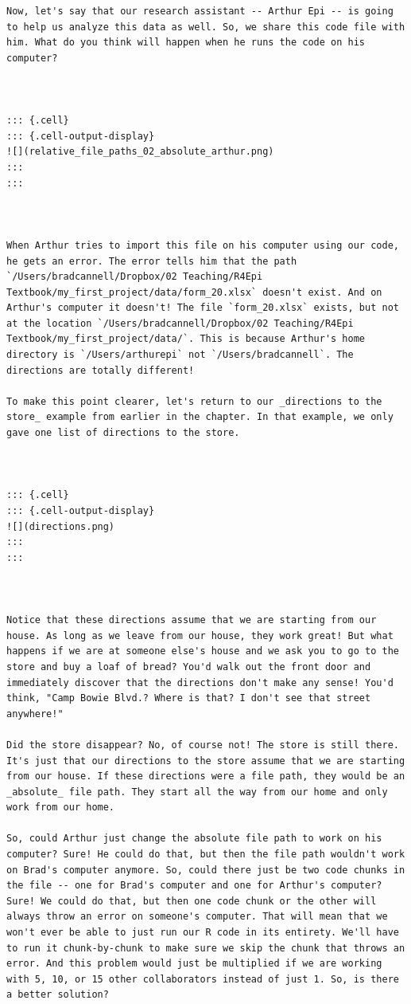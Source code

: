 \documentclass[
  letterpaper,
  DIV=11,
  numbers=noendperiod]{scrreprt}
\begin{document}
\begin{verbatim}
Now, let's say that our research assistant -- Arthur Epi -- is going to help us analyze this data as well. So, we share this code file with him. What do you think will happen when he runs the code on his computer?



::: {.cell}
::: {.cell-output-display}
![](relative_file_paths_02_absolute_arthur.png)
:::
:::



When Arthur tries to import this file on his computer using our code, he gets an error. The error tells him that the path `/Users/bradcannell/Dropbox/02 Teaching/R4Epi Textbook/my_first_project/data/form_20.xlsx` doesn't exist. And on Arthur's computer it doesn't! The file `form_20.xlsx` exists, but not at the location `/Users/bradcannell/Dropbox/02 Teaching/R4Epi Textbook/my_first_project/data/`. This is because Arthur's home directory is `/Users/arthurepi` not `/Users/bradcannell`. The directions are totally different!

To make this point clearer, let's return to our _directions to the store_ example from earlier in the chapter. In that example, we only gave one list of directions to the store.



::: {.cell}
::: {.cell-output-display}
![](directions.png)
:::
:::



Notice that these directions assume that we are starting from our house. As long as we leave from our house, they work great! But what happens if we are at someone else's house and we ask you to go to the store and buy a loaf of bread? You'd walk out the front door and immediately discover that the directions don't make any sense! You'd think, "Camp Bowie Blvd.? Where is that? I don't see that street anywhere!" 

Did the store disappear? No, of course not! The store is still there. It's just that our directions to the store assume that we are starting from our house. If these directions were a file path, they would be an _absolute_ file path. They start all the way from our home and only work from our home.

So, could Arthur just change the absolute file path to work on his computer? Sure! He could do that, but then the file path wouldn't work on Brad's computer anymore. So, could there just be two code chunks in the file -- one for Brad's computer and one for Arthur's computer? Sure! We could do that, but then one code chunk or the other will always throw an error on someone's computer. That will mean that we won't ever be able to just run our R code in its entirety. We'll have to run it chunk-by-chunk to make sure we skip the chunk that throws an error. And this problem would just be multiplied if we are working with 5, 10, or 15 other collaborators instead of just 1. So, is there a better solution? 


\end{verbatim}
\end{document}
